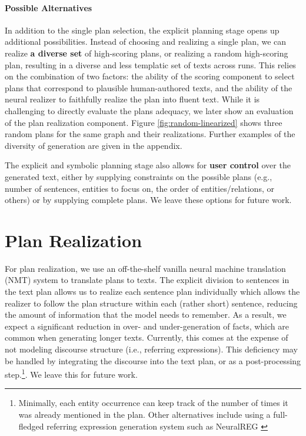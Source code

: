 \documentclass[11pt,a4paper]{article}
\begin{document}
\paragraph{Possible Alternatives} In addition to the single plan selection, the explicit planning stage opens up additional possibilities. Instead of choosing and realizing a single plan, we can realize \textbf{a diverse set} of high-scoring plans, or realizing a random high-scoring plan, resulting in a diverse and less templatic set of texts across runs. 
This relies on the combination of two factors: the ability of the scoring component to select plans that correspond to plausible human-authored texts, and the ability of the neural realizer to faithfully realize the plan into fluent text. While it is challenging to directly evaluate the plans adequacy, we later show an evaluation of the plan realization component. Figure \ref{fig:random-linearized} shows three random plans for the same graph and their realizations. Further examples of the diversity of generation are given in the appendix. 

The explicit and symbolic planning stage also allows for \textbf{user control} over the generated text, either by supplying constraints on the possible plans (e.g., number of sentences, entities to focus on, the order of entities/relations, or others) or by supplying complete plans. We leave these options for future work.


\section{Plan Realization}\label{sec:plan-neural} 

For plan realization, we use an off-the-shelf vanilla neural machine translation (NMT) system to translate plans to texts.
The explicit division to sentences in the text plan allows us to realize each sentence plan individually which allows the realizer to follow the plan structure within each (rather short) sentence, reducing the amount of information that the model needs to remember. As a result, we expect a significant reduction in over- and under-generation of facts, which are common when generating longer texts. Currently, this comes at the expense of not modeling discourse structure (i.e., referring expressions). This deficiency may be handled by integrating the discourse into the text plan, or as a post-processing step.\footnote{Minimally, each entity occurrence can keep track of the number of times it was already mentioned in the plan. Other alternatives include using a full-fledged referring expression generation system such as NeuralREG \cite{ferreira2018neuralreg}}. We leave this for future work.
\end{document}
